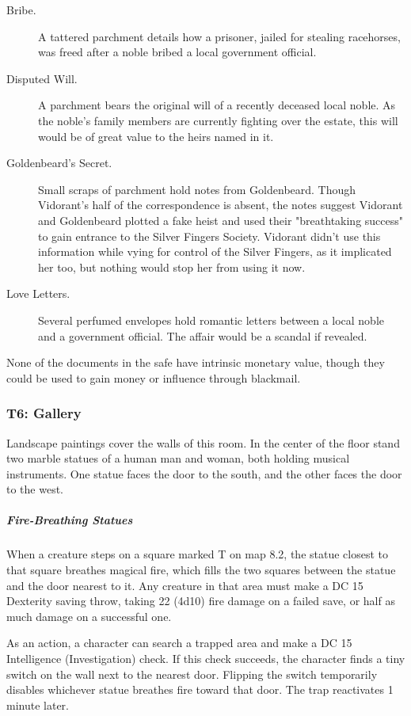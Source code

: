 \documentclass[10pt,a4paper,twoside,bg=print,twocolumn,openany,nodeprecatedcode]{dndbook}
\begin{document}
\begin{description}
\item[Bribe.]
A tattered parchment details how a prisoner, jailed for stealing racehorses, was freed after a noble bribed a local government official.
\item[Disputed Will.]
A parchment bears the original will of a recently deceased local noble. As the noble's family members are currently fighting over the estate, this will would be of great value to the heirs named in it.
\item[Goldenbeard's Secret.]
Small scraps of parchment hold notes from Goldenbeard. Though Vidorant's half of the correspondence is absent, the notes suggest Vidorant and Goldenbeard plotted a fake heist and used their "breathtaking success" to gain entrance to the Silver Fingers Society. Vidorant didn't use this information while vying for control of the Silver Fingers, as it implicated her too, but nothing would stop her from using it now.
\item[Love Letters.]
Several perfumed envelopes hold romantic letters between a local noble and a government official. The affair would be a scandal if revealed.
\end{description}

None of the documents in the safe have intrinsic monetary value, though they could be used to gain money or influence through blackmail.

\subsubsection{T6: Gallery}
\begin{DndReadAloud}{}
Landscape paintings cover the walls of this room. In the center of the floor stand two marble statues of a human man and woman, both holding musical instruments. One statue faces the door to the south, and the other faces the door to the west.

\end{DndReadAloud}

\subparagraph{Fire-Breathing Statues}
When a creature steps on a square marked T on map 8.2, the statue closest to that square breathes magical fire, which fills the two squares between the statue and the door nearest to it. Any creature in that area must make a DC 15 Dexterity saving throw, taking 22 (4d10) fire damage on a failed save, or half as much damage on a successful one.

As an action, a character can search a trapped area and make a DC 15 Intelligence (Investigation) check. If this check succeeds, the character finds a tiny switch on the wall next to the nearest door. Flipping the switch temporarily disables whichever statue breathes fire toward that door. The trap reactivates 1 minute later.
\end{document}
